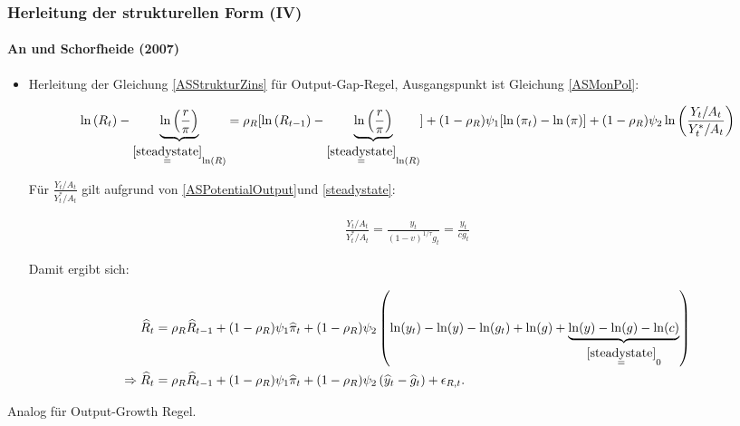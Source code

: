 \documentclass[10pt]{beamer}  %
\begin{document}
\begin{frame}
\frametitle{Herleitung der strukturellen Form (IV)}\framesubtitle{An und Schorfheide (2007)}\small
\begin{itemize}
\item Herleitung der Gleichung \eqref{ASStrukturZins} f\"{u}r Output-Gap-Regel, Ausgangspunkt ist Gleichung \eqref{ASMonPol}:
\begin{tiny}\begin{align*}
  \ln{(R_t)} - \underbrace{\ln\left(\frac{r}{\pi}\right)}_{\overset{\eqref{steadystate}}{=}\ln(R)}= \rho_R  [\ln{\left(R_{t-1}\right)} - \underbrace{\ln\left(\frac{r}{\pi}\right)}_{\overset{\eqref{steadystate}}{=}\ln(R)} ]
  + (1-\rho_R) \psi_1 [\ln{\left(\pi_t\right)}-\ln{\left(\pi\right)}] + (1-\rho_R)\psi_2 \ln{\left(\frac{Y_t/A_t}{Y_t^*/A_t}\right)}
\end{align*}\end{tiny}
F\"{u}r $\frac{Y_t/A_t}{Y_t^*/A_t}$ gilt aufgrund von \eqref{ASPotentialOutput}und \eqref{steadystate}:
\begin{scriptsize}\begin{align*}
  \frac{Y_t/A_t}{Y_t^*/A_t} = \frac{y_t}{\left(1-v\right)^{1/\tau} g_t} = \frac{y_t}{c g_t}
\end{align*}\end{scriptsize}
Damit ergibt sich:
\begin{tiny}\begin{align*}
\widehat{R}_t &= \rho_R \widehat{R}_{t-1} + (1-\rho_R)\psi_1 \widehat{\pi}_t + (1-\rho_R)\psi_2 \left(\ln(y_t) - \ln(y) -\ln(g_t) + \ln(g) + \underbrace{\ln(y) -\ln(g) - \ln(c)}_{\overset{\eqref{steadystate}}{=}0} \right)\\
\Rightarrow  \widehat{R}_t &= \rho_R \widehat{R}_{t-1} + (1-\rho_R)\psi_1 \widehat{\pi}_t + (1-\rho_R)\psi_2
\left(\widehat{y}_t-  \widehat{g}_t\right) + \epsilon_{R,t}.
\end{align*}\end{tiny}
\end{itemize}
Analog f\"{u}r Output-Growth Regel.
\hyperlink{Struktur}{}
\end{frame}
\end{document}
